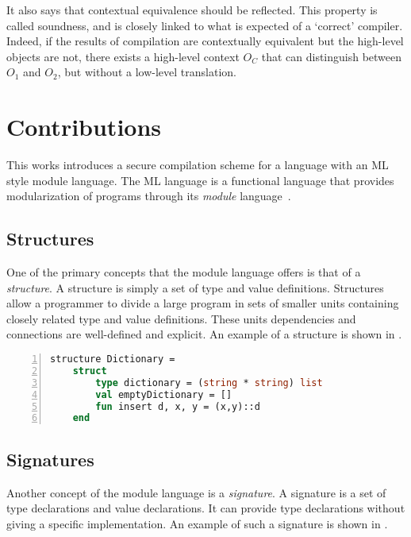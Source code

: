 \documentclass[11pt]{article}
\begin{document}
It also says that contextual equivalence should be reflected.
This property is called soundness, and is closely linked to what is expected of a `correct' compiler.
Indeed, if the results of compilation are contextually equivalent but the high-level objects are not, there exists a high-level context $O_C$ that can distinguish between $O_1$ and $O_2$, but without a low-level translation.

\section{Contributions}
This works introduces a secure compilation scheme for a language with an ML style module language.
The ML language is a functional language that provides modularization of programs through its \emph{module} language~\cite{Milner:1997:DSM:549659}.

\subsection{Structures}
One of the primary concepts that the module language offers is that of a \emph{structure}. A structure is simply a set of type and value definitions.
Structures allow a programmer to divide a large program in sets of smaller units containing closely related type and value definitions.
These units dependencies and connections are well-defined and explicit.
An example of a structure is shown in .

\begin{lstlisting}[frame=single, language=ML,caption={[Dictionary Definition Example]An example structure showing the definition of a dictionary in ML.}, label=lst:DictionaryStructureExample,numbers=left]
structure Dictionary =
    struct
        type dictionary = (string * string) list
        val emptyDictionary = []
        fun insert d, x, y = (x,y)::d
    end
\end{lstlisting}

\subsection{Signatures}
Another concept of the module language is a \emph{signature}.
A signature is a set of type declarations and value declarations. It can provide type declarations without giving a specific implementation.
An example of such a signature is shown in .
\end{document}
